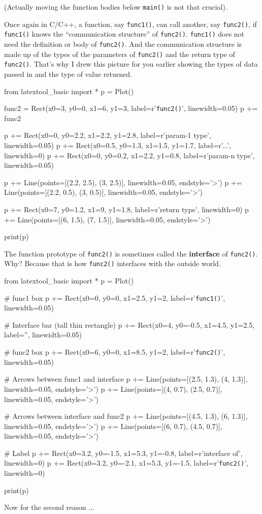 (Actually moving the function bodies below \texttt{main()} is not that crucial).

Once again in C/C++, a function, say \texttt{func1()}, can call another,
say \texttt{func2()}, if \texttt{func1()} knows the ``communication
structure'' of \texttt{func2()}. \texttt{func1()} does not need the
definition or body of \texttt{func2()}. And the communication structure is
made up of the types of the parameters of \texttt{func2()} and the return
type of \texttt{func2()}. That's why I drew this picture
for you earlier showing the types of data passed in and the type of
value returned.

\begin{python}
from latextool_basic import *
p = Plot()

func2 = Rect(x0=3, y0=0, x1=6, y1=3, label=r'{\tt func2()}', linewidth=0.05)
p += func2

p += Rect(x0=0, y0=2.2, x1=2.2, y1=2.8, label=r'{\small param-1 type}', linewidth=0.05)
p += Rect(x0=0.5, y0=1.3, x1=1.5, y1=1.7, label=r'{\small ...}', linewidth=0)
p += Rect(x0=0, y0=0.2, x1=2.2, y1=0.8, label=r'{\small param-n type}', linewidth=0.05)

p += Line(points=[(2.2, 2.5), (3, 2.5)], linewidth=0.05, endstyle='>')
p += Line(points=[(2.2, 0.5), (3, 0.5)], linewidth=0.05, endstyle='>')

p += Rect(x0=7, y0=1.2, x1=9, y1=1.8, label=r'{\small return type}', linewidth=0)
p += Line(points=[(6, 1.5), (7, 1.5)], linewidth=0.05, endstyle='>')

print(p)
\end{python}

The function prototype of \texttt{func2()} is sometimes called the
\textbf{interface} of \texttt{func2()}. Why? Because that is how
\texttt{func2()} interfaces with the outside world.

\begin{python}
from latextool_basic import *
p = Plot()

# func1 box
p += Rect(x0=0, y0=0, x1=2.5, y1=2, label=r'{\tt func1()}', linewidth=0.05)

# Interface bar (tall thin rectangle)
p += Rect(x0=4, y0=-0.5, x1=4.5, y1=2.5, label='', linewidth=0.05)

# func2 box
p += Rect(x0=6, y0=0, x1=8.5, y1=2, label=r'{\tt func2()}', linewidth=0.05)

# Arrows between func1 and interface
p += Line(points=[(2.5, 1.3), (4, 1.3)], linewidth=0.05, endstyle='>')
p += Line(points=[(4, 0.7), (2.5, 0.7)], linewidth=0.05, endstyle='>')

# Arrows between interface and func2
p += Line(points=[(4.5, 1.3), (6, 1.3)], linewidth=0.05, endstyle='>')
p += Line(points=[(6, 0.7), (4.5, 0.7)], linewidth=0.05, endstyle='>')

# Label
p += Rect(x0=3.2, y0=-1.5, x1=5.3, y1=-0.8, label=r'{\small interface of}', linewidth=0)
p += Rect(x0=3.2, y0=-2.1, x1=5.3, y1=-1.5, label=r'{\small \texttt{func2()}}', linewidth=0)

print(p)
\end{python}


Now for the second reason ...

